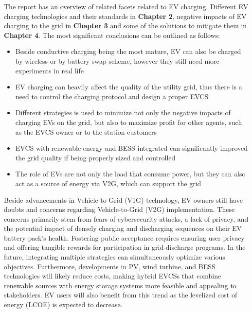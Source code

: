 \documentclass{thesis}
\begin{document}
The report has an overview of related facets related to EV charging. Different EV charging technologies and their standards in \textbf{Chapter 2}, negative impacts of EV charging to the grid in \textbf{Chapter 3} and some of the solutions to mitigate them in \textbf{Chapter 4}. The most significant conclusions can be outlined as follows:
\begin{itemize}
    \item Beside conductive charging being the most mature, EV can also be charged by wireless or by battery swap scheme, however they still need more experiments in real life
    \item EV charging can heavily affect the quality of the utility grid, thus there is a need to control the charging protocol and design a proper EVCS
    \item Different strategies is used to minimize not only the negative impacts of charging EVs on the grid, but also to maximize profit for other agents, such as the EVCS owner or to the station customers
    \item EVCS with renewable energy and BESS integrated can significantly improved the grid quality if being properly sized and controlled
    \item The role of EVs are not only the load that consume power, but they can also act as a source of energy via V2G, which can support the grid
\end{itemize}

Beside advancements in Vehicle-to-Grid (V1G) technology, EV owners still have doubts and concerns regarding Vehicle-to-Grid (V2G) implementation. These concerns primarily stem from fears of cybersecurity attacks, a lack of privacy, and the potential impact of densely charging and discharging sequences on their EV battery pack's health. Fostering public acceptance requires ensuring user privacy and offering tangible rewards for participation in grid-discharge programs. In the future, integrating multiple strategies can simultaneously optimize various objectives. Furthermore, developments in PV, wind turbine, and BESS technologies will likely reduce costs, making hybrid EVCSs that combine renewable sources with energy storage systems more feasible and appealing to stakeholders. EV users will also benefit from this trend as the levelized cost of energy (LCOE) is expected to decrease.

\newpage


\newpage


\newpage
\thispagestyle{empty}
\end{document}
